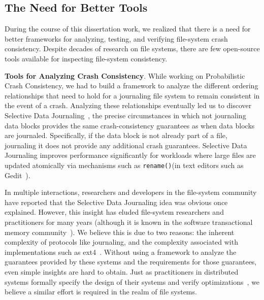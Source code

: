 \subsection{The Need for Better Tools}
\label{sec-conc-lessson-tools}

During the course of this dissertation work, we realized that there is
a need for better frameworks for analyzing, testing, and verifying
file-system crash consistency. Despite decades of research on file
systems, there are few open-source tools available for inspecting
file-system consistency.

\vspace{0.1in} \noindent \textbf{Tools for Analyzing Crash
  Consistency}. While working on Probabilistic Crash Consistency, we
had to build a framework to analyze the different ordering
relationships that need to hold for a journaling file system to remain
consistent in the event of a crash. Analyzing these relationships
eventually led us to discover Selective Data
Journaling~\cite{Chidambaram+13-OptFS}, the precise circumstances in
which not journaling data blocks provides the same crash-consistency
guarantees as when data blocks are journaled. Specifically, if the
data block is not already part of a file, journaling it does not
provide any additional crash guarantees. Selective Data Journaling
improves performance significantly for workloads where large files are
updated atomically via mechanisms such as \texttt{rename()}(\eg in
text editors such as Gedit~\cite{gedit}).

In multiple interactions, researchers and developers in the
file-system community have reported that the Selective Data Journaling
idea was obvious once explained. However, this insight has eluded
file-system researchers and practitioners for many years (although it
is known in the software transactional memory
community~\cite{capturedmem09, Harris06, adl2006compiler}). We believe
this is due to two reasons: the inherent complexity of protocols like
journaling, and the complexity associated with implementations such as
ext4~\cite{newcombe2015amazon}. Without using a framework to analyze
the guarantees provided by these systems and the requirements for
those guarantees, even simple insights are hard to obtain. Just as
practitioners in distributed systems formally specify the design of
their systems and verify optimizations~\cite{newcombe2015amazon,
  Lamport02-BookTLA}, we believe a similar effort is required in the
realm of file systems.


